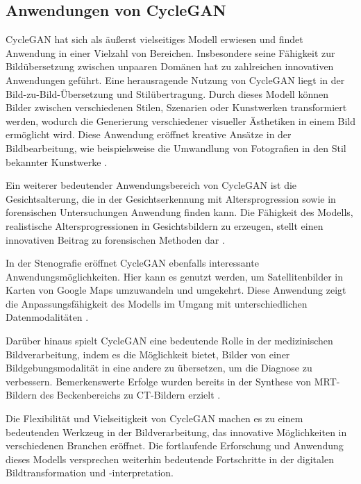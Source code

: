 \subsection{Anwendungen von CycleGAN}
CycleGAN hat sich als äußerst vielseitiges Modell erwiesen und findet Anwendung in einer Vielzahl von Bereichen. Insbesondere seine Fähigkeit zur Bildübersetzung zwischen unpaaren Domänen hat zu zahlreichen innovativen Anwendungen geführt. Eine herausragende Nutzung von CycleGAN liegt in der Bild-zu-Bild-Übersetzung und Stilübertragung. Durch dieses Modell können Bilder zwischen verschiedenen Stilen, Szenarien oder Kunstwerken transformiert werden, wodurch die Generierung verschiedener visueller Ästhetiken in einem Bild ermöglicht wird. Diese Anwendung eröffnet kreative Ansätze in der Bildbearbeitung, wie beispielsweise die Umwandlung von Fotografien in den Stil bekannter Kunstwerke \cite{Zhu.2017}.

Ein weiterer bedeutender Anwendungsbereich von CycleGAN ist die Gesichtsalterung, die in der Gesichtserkennung mit Altersprogression sowie in forensischen Untersuchungen Anwendung finden kann. Die Fähigkeit des Modells, realistische Altersprogressionen in Gesichtsbildern zu erzeugen, stellt einen innovativen Beitrag zu forensischen Methoden dar \cite{Sharma.2022}.

In der Stenografie eröffnet CycleGAN ebenfalls interessante Anwendungsmöglichkeiten. Hier kann es genutzt werden, um Satellitenbilder in Karten von Google Maps umzuwandeln und umgekehrt. Diese Anwendung zeigt die Anpassungsfähigkeit des Modells im Umgang mit unterschiedlichen Datenmodalitäten \cite{Chu.2017}.

Darüber hinaus spielt CycleGAN eine bedeutende Rolle in der medizinischen Bildverarbeitung, indem es die Möglichkeit bietet, Bilder von einer Bildgebungsmodalität in eine andere zu übersetzen, um die Diagnose zu verbessern. Bemerkenswerte Erfolge wurden bereits in der Synthese von MRT-Bildern des Beckenbereichs zu CT-Bildern erzielt \cite{Liu.2021}.

Die Flexibilität und Vielseitigkeit von CycleGAN machen es zu einem bedeutenden Werkzeug in der Bildverarbeitung, das innovative Möglichkeiten in verschiedenen Branchen eröffnet. Die fortlaufende Erforschung und Anwendung dieses Modells versprechen weiterhin bedeutende Fortschritte in der digitalen Bildtransformation und -interpretation.